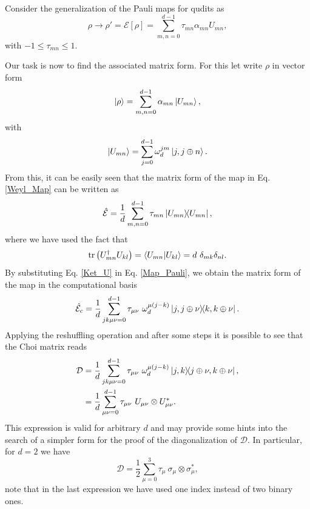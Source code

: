 Consider the generalization of the Pauli maps for qudits as
% 
\begin{equation}
\rho \to \rho'=\mathcal{E}[\rho ]=\sum_{m,n=0}^{d-1} \tau_{mn} \alpha_{mn} U_{mn},
\label{Weyl_Map}
\end{equation}
% 
with $-1\leq \tau_{mn} \leq 1$. 

Our task is now to find the associated matrix form. For this let write $\rho$ in vector form
% 
\begin{equation}
\ket{\rho} = \sum_{m,n=0}^{d-1} \alpha_{mn} \ket{U_{mn}},
\end{equation}
% 
with
% 
\begin{equation}
\ket{U_{mn}}=\sum_{j=0}^{d-1}\omega_d^{j m}\ket{j,j\oplus n}.
\label{Ket_U}
\end{equation}
% 
From this, it can be easily seen that the matrix form of the map in Eq. \ref{Weyl_Map} can be written as
% 
\begin{equation}
\hat{\mathcal{E}} = \frac{1}{d}\sum_{m,n=0}^{d-1} \tau_{mn} \dyad{U_{mn}},
\label{Map_Pauli}
\end{equation}
% 
where we have used the fact that
% 
\begin{equation}
 \tr \left(U_{mn}^{\dagger} U_{kl}\right) = \braket{{U_{mn}}}{{U_{kl}}} = d ~\delta_{mk}\delta_{nl}.
\end{equation}
% 
By substituting Eq. \ref{Ket_U} in Eq. \ref{Map_Pauli}, we obtain the matrix form of the map in the computational basis
% 
\begin{equation}
 \hat{\mathcal{E}}_c = \frac{1}{d}\sum_{jk\mu\nu=0}^{d-1} \tau_{\mu\nu}~ \omega_d^{\mu (j-k)} \dyad{j,j\oplus \nu}{k,k\oplus \nu}.
\end{equation}
% 
Applying the reshuffling operation and after some steps it is possible to see that the Choi matrix reads
% 
\begin{align}
 \mathcal{D} &=  \frac{1}{d}\sum_{jk\mu\nu=0}^{d-1} \tau_{\mu\nu}~ \omega_d^{\mu (j-k)} \dyad{j,k}{j\oplus \nu,k\oplus \nu},\\
 & = \frac{1}{d}\sum_{\mu\nu=0}^{d-1} \tau_{\mu\nu} ~U_{\mu\nu}\otimes U_{\mu\nu}^*.
 \label{Choi_1}
\end{align}
% 
This expression is valid for arbitrary $d$ and may provide some hints into the search of a simpler form for the proof of the diagonalization of $\mathcal{D}$. In particular, for $d=2$ we have
%  
\begin{equation}
  \mathcal{D} = \frac{1}{2}\sum_{\mu=0}^{3} \tau_{\mu} ~\sigma_{\mu}\otimes \sigma_{\mu}^*,
\end{equation}
% 
note that in the last expression we have used one index instead of two binary ones.

